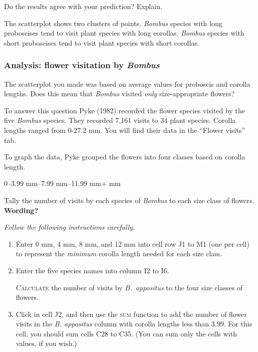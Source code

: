 \documentclass[12pt, hidelinks]{exam}
\newcommand*\AnswerBox[2]{%
    \parbox[t][#1]{0.92\textwidth}{%
    \begin{solution}#2\end{solution}}
    \vspace{\stretch{1}}
}
\begin{document}
\begin{questions}
\question
Do the results agree with your prediction? Explain.

\AnswerBox{3\baselineskip}{The scatterplot shows two clusters of points. 
\textit{Bombus} species with long proboscises tend to visit plant species with 
long corollas. \textit{Bombus} species with short proboscises tend to visit plant species with short corollas.}


\subsubsection*{Analysis: flower visitation by \textit{Bombus}}

The scatterplot you made was based on average values for proboscis and corolla 
lengths. Does this mean that \textit{Bombus} visited \emph{only} size-appropriate flowers?  

To answer this question Pyke (1982) recorded the flower species visited by the five \textit{Bombus} species. They recorded 7,161 visits to 34 plant species. Corolla lengths ranged from 0-27.2 mm. You will find their data in the “Flower visits” tab.

To graph the data, Pyke grouped the flowers into four classes based on corolla length.

0–3.99 mm–7.99 mm–11.99 mm$+$ mm

\question
Tally the number of visits by each species of \textit{Bombus} to each size class of flowers. \textbf{Wording?}

\emph{Follow the following instructions carefully.}

\begin{enumerate}
	\item Enter 0 mm, 4 mm, 8 mm, and 12 mm into cell row J1 to M1 (one per cell)
	to represent the \emph{minimum} corolla length needed for each size class.
	
	\item Enter the five species names into column I2 to I6.
	
	\textsc{Calculate} the number of visits by \textit{B.~appositus} to the four
	size classes of flowers. 
	
	\item Click in cell J2, and then use the \textsc{sum} function to add the
	number of flower visits in the \textit{B. appositus} column with corolla
	lengths less than 3.99. For this cell, you should sum cells C28 to C35. 
	(You can sum only the cells with values, if you wish.)
	

\end{enumerate}
\end{questions}
\end{document}
